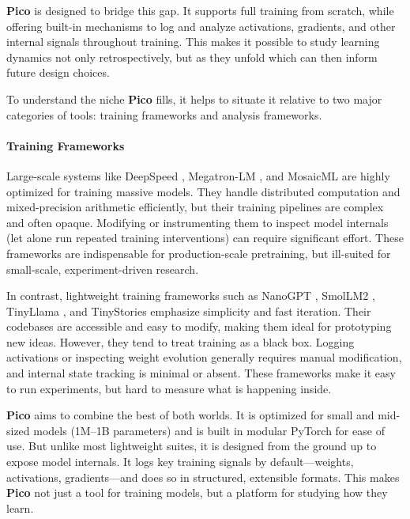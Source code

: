 \textbf{Pico} is designed to bridge this gap. It supports full training from scratch, while offering built-in mechanisms to log and analyze activations, gradients, and other internal signals throughout training. This makes it possible to study learning dynamics not only retrospectively, but as they unfold which can then inform future design choices.

To understand the niche \textbf{Pico} fills, it helps to situate it relative to two major categories of tools: training frameworks and analysis frameworks.

\paragraph{Training Frameworks}
Large-scale systems like DeepSpeed \citep{rasley2020deepspeed}, Megatron-LM \citep{narayanan2021megatron}, and MosaicML \citep{mosaic2023mpt} are highly optimized for training massive models. They handle distributed computation and mixed-precision arithmetic efficiently, but their training pipelines are complex and often opaque. Modifying or instrumenting them to inspect model internals (let alone run repeated training interventions) can require significant effort. These frameworks are indispensable for production-scale pretraining, but ill-suited for small-scale, experiment-driven research.

In contrast, lightweight training frameworks such as NanoGPT \citep{karpathy2023nanogpt}, SmolLM2 \citep{allal2025smollm2}, TinyLlama \citep{zhang2024tinyllama}, and TinyStories \citep{eldan2023tinystories} emphasize simplicity and fast iteration. Their codebases are accessible and easy to modify, making them ideal for prototyping new ideas. However, they tend to treat training as a black box. Logging activations or inspecting weight evolution generally requires manual modification, and internal state tracking is minimal or absent. These frameworks make it easy to run experiments, but hard to measure what is happening inside.

\textbf{Pico} aims to combine the best of both worlds. It is optimized for small and mid-sized models (1M--1B parameters) and is built in modular PyTorch for ease of use. But unlike most lightweight suites, it is designed from the ground up to expose model internals. It logs key training signals by default—weights, activations, gradients—and does so in structured, extensible formats. This makes \textbf{Pico} not just a tool for training models, but a platform for studying how they learn.

